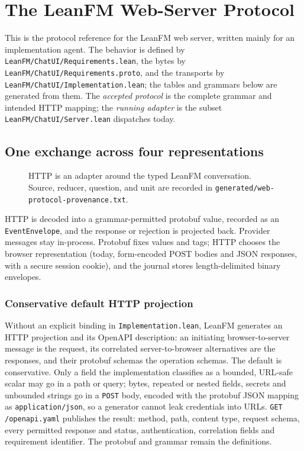 \chapter{The LeanFM Web-Server Protocol}
\label{ch:web-protocol}

This is the protocol reference for the LeanFM web server, written mainly for an
implementation agent. The behavior is defined by
\nolinkurl{LeanFM/ChatUI/Requirements.lean}, the bytes by
\nolinkurl{LeanFM/ChatUI/Requirements.proto}, and the transports by
\nolinkurl{LeanFM/ChatUI/Implementation.lean}; the tables and grammars below are
generated from them. The \emph{accepted protocol} is the complete grammar and
intended HTTP mapping; the \emph{running adapter} is the subset
\texttt{LeanFM/ChatUI/Server.lean} dispatches today.

\section{One exchange across four representations}

\begin{figure}[htbp]
\centering
\resizebox{\textwidth}{!}{}
\caption{HTTP is an adapter around the typed LeanFM conversation. Source,
reducer, question, and unit are recorded in
\texttt{generated/web-protocol-provenance.txt}.}
\label{fig:web-protocol-overview}
\end{figure}

HTTP is decoded into a grammar-permitted protobuf value, recorded as an
\texttt{EventEnvelope}, and the response or rejection is projected back. Provider
messages stay in-process. Protobuf fixes values and tags; HTTP chooses the browser
representation (today, form-encoded POST bodies and JSON responses, with a secure
session cookie), and the journal stores length-delimited binary envelopes.

\subsection{Conservative default HTTP projection}

Without an explicit binding in \texttt{Implementation.lean}, LeanFM generates an
HTTP projection and its OpenAPI description: an initiating browser-to-server
message is the request, its correlated server-to-browser alternatives are the
responses, and their protobuf schemas the operation schemas. The default is
conservative. Only a field the implementation classifies as a bounded, URL-safe
scalar may go in a path or query; bytes, repeated or nested fields, secrets and
unbounded strings go in a \texttt{POST} body, encoded with the protobuf JSON
mapping as \texttt{application/json}, so a generator cannot leak credentials into
URLs. \texttt{GET /openapi.yaml} publishes the result: method, path, content type,
request schema, every permitted response and status, authentication, correlation
fields and requirement identifier. The protobuf and grammar remain the definitions.

